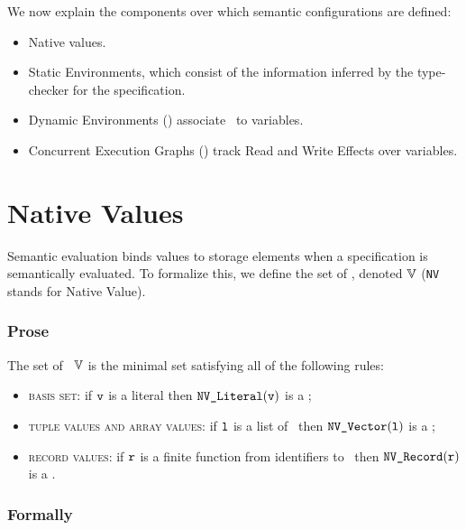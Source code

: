 We now explain the components over which semantic configurations are defined:
\begin{itemize}
    \item Native values.
    \item Static Environments, which consist of the information inferred
            by the type-checker for the specification.
    \item Dynamic Environments () associate \nativevalues\ to variables.
    \item Concurrent Execution Graphs () track Read and Write Effects over variables.
\end{itemize}

\hypertarget{def-vals}{}
\hypertarget{def-nativevalue}{}
\hypertarget{def-nativevalues}{}
\section{Native Values\label{sec:nativevalues}}
Semantic evaluation binds values to storage elements when a specification is semantically evaluated.
To formalize this, we define the set of \emph{\nativevalues}, denoted $\mathbb{V}$
(\texttt{NV} stands for Native Value).

\subsubsection{Prose}
The set of \nativevalues\ $\mathbb{V}$ is the minimal set satisfying all of the following rules:
\begin{itemize}
  \item \textsc{basis set}: if $\texttt{v}$ is a literal then $\texttt{NV\_Literal}(\texttt{v})$ is a \nativevalue;
  \item \textsc{tuple values and array values}: if $\texttt{l}$ is a list of \nativevalues\ then $\texttt{NV\_Vector}(\texttt{l})$ is a \nativevalue;
  \item \textsc{record values}: if $\texttt{r}$ is a finite function from identifiers to \nativevalues\ then $\texttt{NV\_Record}(\texttt{r})$ is a \nativevalue.
\end{itemize}

\subsubsection{Formally}
\hypertarget{def-nvliteral}{}
\hypertarget{def-nvvector}{}
\hypertarget{def-nvrecord}{}

